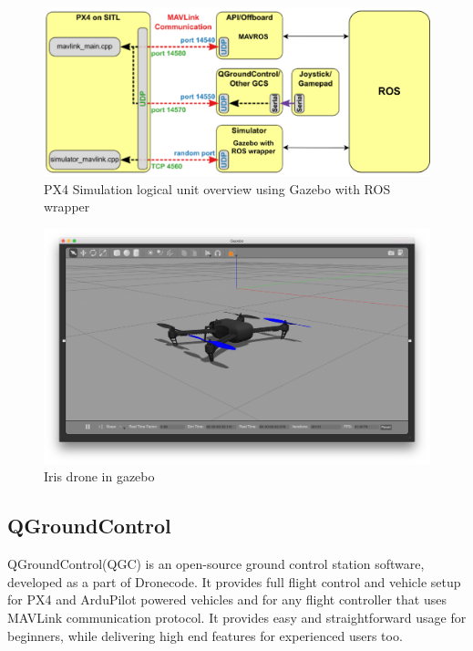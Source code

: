 \begin{figure}[h]
    \centering
    \includegraphics[width=140mm, keepaspectratio]{figures/px4_sitl_with_ros.png}
    \caption{PX4 Simulation logical unit overview using Gazebo with ROS wrapper}
    \label{fig:px4_sitl_ros_wrapper}
\end{figure}

\begin{figure}[h]
    \centering
    \includegraphics[width=140mm]{figures/iris_gazebo.png}
    \caption{Iris drone in gazebo}
    \label{fig:px4_sitl_iris}
\end{figure}

\subsection{QGroundControl}
QGroundControl(QGC) is an open-source ground control station software, developed as a part of Dronecode. It provides
full flight control and vehicle setup for PX4 and ArduPilot powered vehicles and for any flight controller that
uses MAVLink communication protocol. It provides easy and straightforward usage for beginners, while delivering
high end features for experienced users too.

